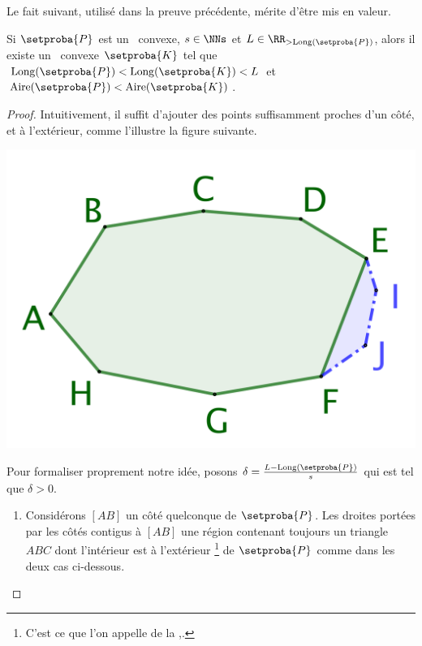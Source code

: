 

Le fait suivant, utilisé dans la preuve précédente, mérite d'être mis en valeur.


\begin{fact} \label{bigger-convex}
    Si $\setproba{P}$ est un \ngone\ convexe, $s \in \NNs$ et $L \in \RR_{>\cyclelen{\setproba{P}}}$,
    alors il existe un \ convexe $\setproba{K}$ tel que
	$\cyclelen{\setproba{P}} < \cyclelen{\setproba{K}} < L$
	et
	$\area{\setproba{P}} < \area{\setproba{K}}$.
\end{fact}


\begin{proof}
    Intuitivement, il suffit d'ajouter des points suffisamment proches d'un côté, et à l'extérieur, comme l'illustre la figure suivante.
    \begin{center}
        \includegraphics[scale=.4]{content/polygon/at-least-one/bigger-convex.png}
    \end{center}
    
    Pour formaliser proprement notre idée, posons
	$\delta = \frac{L - \cyclelen{\setproba{P}}}{s}$ qui est tel que $\delta > 0$.
	\begin{enumerate}
		\item \label{add-vertex-start}
		Considérons $[AB]$ un côté quelconque de $\setproba{P}$.
		Les droites portées par les côtés contigus à $[AB]$  une région contenant toujours un triangle $ABC$ dont l'intérieur est à l'extérieur
		\footnote{
			C'est ce que l'on appelle de la ,.
		}
		de $\setproba{P}$ comme dans les deux cas ci-dessous.
		\begin{multicols}{2}
			\centering


\end{multicols}
\end{enumerate}
\end{proof}
